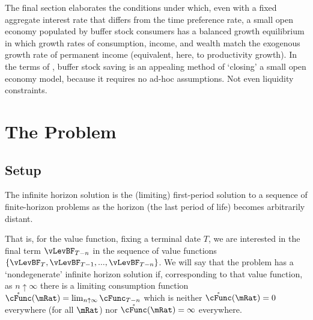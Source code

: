 \documentclass[BufferStockTheory]{subfiles}
\begin{document}
The final section elaborates the conditions under which, even with a fixed aggregate interest rate that differs from the time preference rate, a small open economy populated by buffer stock consumers has a balanced growth equilibrium in which growth rates of consumption, income, and wealth match the exogenous growth rate of permanent income (equivalent, here, to productivity growth). In the terms of \cite{schmitt2003closing}, buffer stock saving is an appealing method of `closing' a small open economy model, because it requires no ad-hoc assumptions.  Not even liquidity constraints.


\hypertarget{The-Problem}{}
\section{The Problem}

\subsection{Setup}\label{subsec:Setup}\label{subsec:setup}

The infinite horizon solution is the (limiting) first-period solution to a sequence of finite-horizon problems as the horizon (the last period of life) becomes arbitrarily distant.

That is, for the value function, fixing a terminal date $T$,  we are interested in the final term $\vLevBF_{T-n}$ in the sequence of value functions $\{\vLevBF_{T},\vLevBF_{T-1},...,\vLevBF_{T-n}\}$.  We will say that the problem has a `nondegenerate' infinite horizon solution if, corresponding to that value function, as $n \uparrow \infty$ there is a limiting consumption function $\mathring{\cFunc}(\mRat) = \lim_{n \uparrow \infty} \cFunc_{T-n}$ which is neither $\mathring{\cFunc}(\mRat)=0$ everywhere (for all $\mRat$) nor $\mathring{\cFunc}(\mRat)=\infty$ everywhere.
\end{document}
